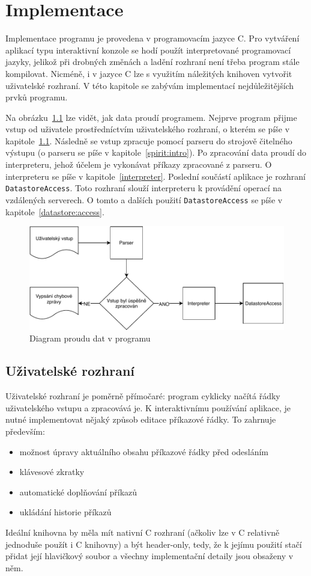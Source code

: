 \documentclass[thesis=B,czech,hidelinks]{FITthesis}[2019/03/06]
\newcommand{\Rplus}{\protect\hspace{-.1em}\protect\raisebox{.35ex}{\smaller{\smaller\textbf{+}}}}
\newcommand{\Cpp}{\mbox{C\Rplus\Rplus}\xspace}
\begin{document}
\chapter{Implementace}
Implementace programu je provedena v programovacím jazyce \Cpp{}. Pro vytváření aplikací typu interaktivní konzole se hodí použít interpretované programovací jazyky, jelikož při drobných změnách a ladění rozhraní není třeba program stále kompilovat. Nicméně, i v jazyce \Cpp{} lze s využitím náležitých knihoven vytvořit uživatelské rozhraní. V této kapitole se zabývám implementací nejdůležitějších prvků programu.

Na obrázku~\ref{proud:dat} lze vidět, jak data proudí programem. Nejprve program přijme vstup od uživatele prostředníctvím uživatelského rozhraní, o kterém se píše v kapitole~\ref{ui}. Následně se vstup zpracuje pomocí parseru do strojově čitelného výstupu (o parseru se píše v kapitole~\ref{spirit:intro}). Po zpracování data proudí do interpreteru, jehož účelem je vykonávat příkazy zpracované z parseru. O interpreteru se píše v kapitole~\ref{interpreter}. Poslední součástí aplikace je rozhraní \texttt{DatastoreAccess}. Toto rozhraní slouží interpreteru k provádění operací na vzdálených serverech. O tomto a dalších použití \texttt{DatastoreAccess} se píše v kapitole~\ref{datastore:access}.
\begin{figure}
\begin{center}
\includegraphics[width=.9\textwidth]{diagram}
\end{center}
\caption{Diagram proudu dat v programu}\label{proud:dat}
\end{figure}


\section{Uživatelské rozhraní}\label{ui}
Uživatelské rozhraní je poměrně přímočaré: program cyklicky načítá řádky uživatelského vstupu a zpracovává je. K interaktivnímu používání aplikace, je nutné implementovat nějaký způsob editace příkazové řádky. To zahrnuje především:
\begin{itemize}
    \item možnost úpravy aktuálního obsahu příkazové řádky před odesláním
    \item klávesové zkratky
    \item automatické doplňování příkazů
    \item ukládání historie příkazů
\end{itemize}
Ideální knihovna by měla mít nativní \Cpp{} rozhraní (ačkoliv lze v \Cpp{} relativně jednoduše použít i C knihovny) a být header-only, tedy, že k jejímu použití stačí přidat její hlavičkový soubor a všechny implementační detaily jsou obsaženy v něm.
\end{document}

